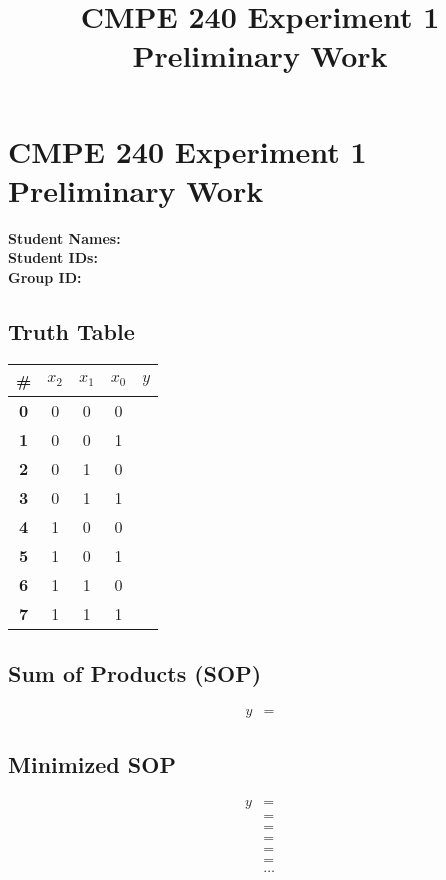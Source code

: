 \documentclass[12pt,a4paper]{report}
\title{CMPE 240 Experiment 1 Preliminary Work}
\begin{document}
\section*{CMPE 240 Experiment 1 Preliminary Work}

\noindent
\textbf{Student Names: } \\
\textbf{Student IDs: } \\
\textbf{Group ID: }

\subsection*{Truth Table}

\begin{center}
\begin{tabular}{|c|ccc|c|}
\hline
\textbf{\#} & \textbf{$x_2$} & \textbf{$x_1$} &\textbf{$x_0$} & \textbf{$y$} \\
\hline
\textbf{0} & 0 & 0 & 0 &   \\
\hline
\textbf{1} & 0 & 0 & 1 &   \\
\hline
\textbf{2} & 0 & 1 & 0 &   \\
\hline
\textbf{3} & 0 & 1 & 1 &   \\
\hline
\textbf{4} & 1 & 0 & 0 &   \\
\hline
\textbf{5} & 1 & 0 & 1 &   \\
\hline
\textbf{6} & 1 & 1 & 0 &   \\
\hline
\textbf{7} & 1 & 1 & 1 &   \\
\hline
\end{tabular}
\end{center}

\subsection*{Sum of Products (SOP)}

\begin{align*}
	y & = 
\end{align*}

\subsection*{Minimized SOP}

\begin{align*}
	y & = \\
	    & = \\
	    & = \\
	    & = \\
	    & = \\
	    & = \\
	    & \ldots
\end{align*}
\end{document}
